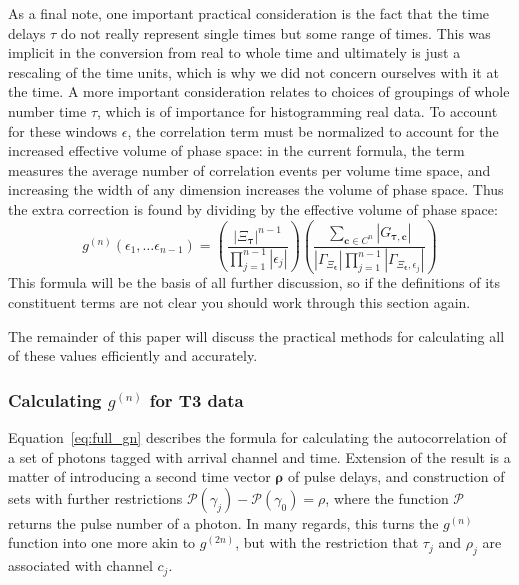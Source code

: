 \documentclass{article}
\newcommand{\parens}[1]{\ensuremath{\left( #1 \right)}}
\newcommand{\gn}[1]{\ensuremath{g^{(#1)}}}
\renewcommand{\vec}{\boldsymbol}
\newcommand{\abs}[1]{\ensuremath{\left|#1\right|}}
\newcommand{\channel}{\ensuremath{c}}
\newcommand{\channels}{\ensuremath{C}}
\newcommand{\photon}{\ensuremath{\gamma}}
\newcommand{\photons}{\ensuremath{\Gamma}}
\newcommand{\Pulse}{\ensuremath{\mathcal{P}}}
\newcommand{\integrationtime}{\ensuremath{\Xi}}
\newcommand{\resolution}{\ensuremath{\epsilon}}
\newcommand{\correlationset}{\ensuremath{G}}
\begin{document}
As a final note, one important practical consideration is the fact that the time delays $\tau$ do not really represent single times but some range of times. This was implicit in the conversion from real to whole time and ultimately is just a rescaling of the time units, which is why we did not concern ourselves with it at the time. A more important consideration relates to choices of groupings of whole number time $\tau$, which is of importance for histogramming real data. To account for these windows $\resolution$, the correlation term must be normalized to account for the increased effective volume of phase space: in the current formula, the term measures the average number of correlation events per volume time space, and increasing the width of any dimension increases the volume of phase space. Thus the extra correction is found by dividing by the effective volume of phase space:
\begin{equation}
\label{eq:full_gn}
\gn{n}(\resolution_{1},\ldots\resolution_{n-1}) = 
   \parens{
        \frac{\abs{\integrationtime_{\vec{\tau}}}^{n-1}}
             {\prod_{j=1}^{n-1}{\abs{\resolution_{j}}}}}
   \parens{
        \frac{\sum_{\vec{\channel}\in\channels^{n}}
                   {\abs{\correlationset_{\vec{\tau},\vec{\channel}}}}}
             {\abs{\photons_{\integrationtime_{\vec{\resolution}}}}
              \prod_{j=1}^{n-1}
                    {\abs{\photons_{\integrationtime_{\vec{\epsilon}},\resolution_{j}}}}}}
\end{equation}
This formula will be the basis of all further discussion, so if the definitions of its constituent terms are not clear you should work through this section again.

The remainder of this paper will discuss the practical methods for calculating all of these values efficiently and accurately.

\subsubsection{Calculating \gn{n} for T3 data}
Equation~\ref{eq:full_gn} describes the formula for calculating the autocorrelation of a set of photons tagged with arrival channel and time. Extension of the result is a matter of introducing a second time vector $\vec{\rho}$ of pulse delays, and construction of sets with further restrictions $\Pulse(\photon_{j})-\Pulse(\photon_{0})=\rho$, where the function $\Pulse$ returns the pulse number of a photon. In many regards, this turns the \gn{n} function into one more akin to \gn{2n}, but with the restriction that $\tau_{j}$ and $\rho_{j}$ are associated with channel $\channel_{j}$.
\end{document}
